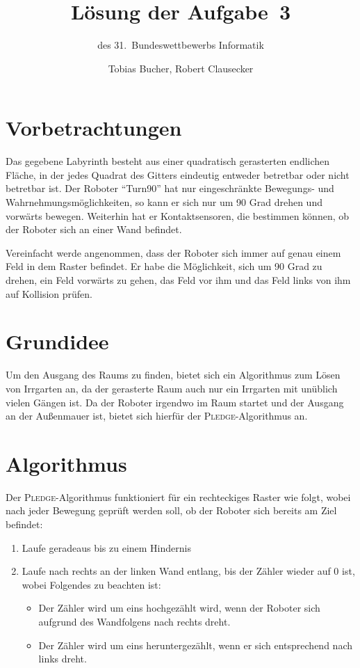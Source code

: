 \documentclass{scrartcl}
\title{Lösung der Aufgabe~3}
\subtitle{des 31.~Bundeswettbewerbs Informatik}
\author{Tobias Bucher, Robert Clausecker}
\begin{document}
\maketitle

\section{Vorbetrachtungen}
Das gegebene Labyrinth besteht aus einer quadratisch gerasterten endlichen
Fläche, in der jedes Quadrat des Gitters eindeutig entweder betretbar oder
nicht betretbar ist. Der Roboter "`Turn90"' hat nur eingeschränkte Bewegungs-
und Wahrnehmungsmöglichkeiten, so kann er sich nur um 90 Grad drehen und
vorwärts bewegen. Weiterhin hat er Kontaktsensoren, die bestimmen können, ob
der Roboter sich an einer Wand befindet.

Vereinfacht werde angenommen, dass der Roboter sich immer auf genau einem Feld
in dem Raster befindet. Er habe die Möglichkeit, sich um 90 Grad zu drehen, ein
Feld vorwärts zu gehen, das Feld vor ihm und das Feld links von ihm auf
Kollision prüfen.

\section{Grundidee}
Um den Ausgang des Raums zu finden, bietet sich ein Algorithmus zum Lösen von
Irrgarten an, da der gerasterte Raum auch nur ein Irrgarten mit unüblich vielen
Gängen ist. Da der Roboter irgendwo im Raum startet und der Ausgang an der
Außenmauer ist, bietet sich hierfür der \textsc{Pledge}-Algorithmus an.

\section{Algorithmus}
Der \textsc{Pledge}-Algorithmus funktioniert für ein rechteckiges Raster wie
folgt, wobei nach jeder Bewegung geprüft werden soll, ob der Roboter sich
bereits am Ziel befindet:

\begin{enumerate}
\item Laufe geradeaus bis zu einem Hindernis
\item Laufe nach rechts an der linken Wand entlang, bis der Zähler wieder auf
$0$ ist, wobei Folgendes zu beachten ist:
	\begin{itemize}
	\item Der Zähler wird um eins hochgezählt wird, wenn der Roboter sich aufgrund des Wandfolgens nach rechts dreht.
	\item Der Zähler wird um eins heruntergezählt, wenn er sich entsprechend nach links dreht.
	\end{itemize}
\end{enumerate}
\end{document}
